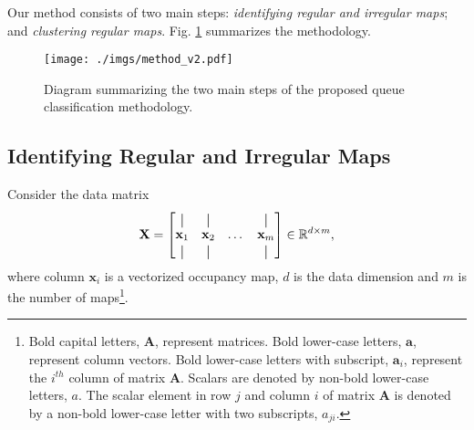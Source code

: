 Our method consists of two main steps: \emph{identifying regular and irregular maps}; and \emph{clustering regular maps}. 
Fig. \ref{fig:method} summarizes the methodology.
\begin{figure}[tbh]
\centering
\texttt{[image: ./imgs/method\_v2.pdf]}
\caption{Diagram summarizing the two main steps of the proposed queue classification methodology.}
\label{fig:method}
\end{figure}
%
\subsection{Identifying Regular and Irregular Maps}
\label{sec:mfs}
%
Consider the data matrix
\begin{equation}
    \mathbf{X}=
\begin{bmatrix}
\vertbar & \vertbar & & \vertbar\\
\mathbf{x}_1 & \mathbf{x}_2 &  \dots  & \mathbf{x}_m \\
\vertbar & \vertbar &  & \vertbar \\
\end{bmatrix}
\in \mathbb{R}^{d\times m},
\end{equation}
where column $\mathbf{x}_i$ is a vectorized occupancy map, $d$ is the data dimension and $m$ is the number of maps\footnote{Bold capital letters, $\mathbf{A}$, represent matrices. Bold lower-case letters, $\mathbf{a}$, represent column vectors. Bold lower-case letters with subscript, $\mathbf{a}_i$, represent the $i^{th}$ column of matrix $\mathbf{A}$. Scalars are denoted by non-bold lower-case letters, $a$. The scalar element in row $j$ and column $i$ of matrix $\mathbf{A}$ is denoted by a non-bold lower-case letter with two subscripts, $a_{ji}$.}. 


